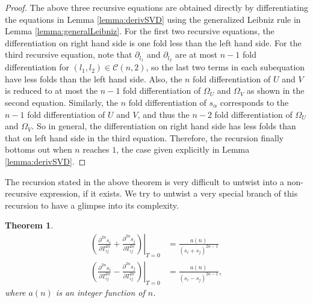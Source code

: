 \documentclass[10pt]{article}
\newtheorem{theorem}{Theorem}
\begin{document}
\begin{proof}
	The above three recursive equations are obtained directly by differentiating the equations in Lemma \ref{lemma:derivSVD} using the generalized Leibniz rule in Lemma \ref{lemma:generalLeibniz}.
	For the first two recursive equations, the differentiation on right hand side is one fold less than the left hand side.
	For the third recursive equation, note that $\partial_{l_1}$ and $\partial_{l_2}$ are at most $n-1$ fold differentiation for $(l_1,l_2)\in\mathcal{C}(n,2)$, so the last two terms in each subequation have less folds than the left hand side.
	Also, the $n$ fold differentiation of $U$ and $V$ is reduced to at most the $n-1$ fold differentiation of $\Omega_U$ and $\Omega_V$ as shown in the second equation.
	Similarly, the $n$ fold differentiation of $s_\alpha$ corresponds to the $n-1$ fold differentiation of $U$ and $V$, and thus the $n-2$ fold differentiation of $\Omega_U$ and $\Omega_V$.
	So in general, the differentiation on right hand side has less folds than that on left hand side in the third equation.
	Therefore, the recursion finally bottoms out when $n$ reaches $1$, the case given explicitly in Lemma \ref{lemma:derivSVD}.
\end{proof}

The recursion stated in the above theorem is very difficult to untwist into a non-recursive expression, if it exists.
We try to untwist a very special branch of this recursion to have a glimpse into its complexity.
\begin{theorem} \label{thm:smallRecursion}
	\begin{align} \label{eqn:dsisjdT}
		\left.\left( \frac{\partial^{2n}s_i}{\partial T_{ij}^{2n}} + \frac{\partial^{2n}s_j}{\partial T_{ij}^{2n}} \right)\right|_{T=0} &= \frac{a(n)}{(s_i+s_j)^{2n-1}} \nonumber \\
		\left.\left( \frac{\partial^{2n}s_i}{\partial T_{ij}^{2n}} - \frac{\partial^{2n}s_j}{\partial T_{ij}^{2n}} \right)\right|_{T=0} &= \frac{a(n)}{(s_i-s_j)^{2n-1}},
	\end{align}
	where $a(n)$ is an integer function of $n$.
\end{theorem}
\end{document}
